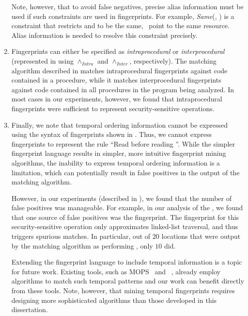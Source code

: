 \begin{enumerate}
Note, however, that to avoid false negatives, precise alias information must be
used if such constraints are used in fingerprints. For example,
\textit{Same}(, ) is a constraint that
restricts  and  to be the same,
\ie~point to the same resource. Alias information is needed to resolve this
constraint precisely. 

\item
Fingerprints can either be specified as \textit{intraprocedural} or
\textit{interprocedural} (represented in 
using $\wedge_{Intra}$ and $\wedge_{Inter}$, respectively). The matching
algorithm described in  matches intraprocedural
fingerprints against code contained in a procedure, while it matches
interprocedural fingerprints against code contained in all procedures in the
program being analyzed. In most cases in our experiments, however, we found
that intraprocedural fingerprints were sufficient to represent
security-sensitive operations.

\item 
Finally, we note that temporal ordering information cannot be expressed using
the syntax of fingerprints shown in .
Thus, we cannot express fingerprints to represent the rule ``Read
 before reading ''. While
the simpler fingerprint language results in simpler, more intuitive fingerprint
mining algorithms, the inability to express temporal ordering information is a
limitation, which can potentially result in false positives in the output of
the matching algorithm.

However, in our experiments (described in ), we found
that the number of false positives was manageable. For example, in our analysis
of the \xserver, we found that one source of false positives was the
 fingerprint. The fingerprint for this security-sensitive
operation only approximates linked-list traversal, and thus triggers spurious
matches. In particular, out of $20$ locations that were output by the matching
algorithm as performing , only $10$ did.

Extending the fingerprint language to include temporal information is a topic
for future work. Existing tools, such as MOPS~\cite{cw02} and
~\cite{hcx+02}, already employ algorithms to match such temporal
patterns and our work can benefit directly from these tools. Note, however,
that mining temporal fingerprints requires designing more sophisticated
algorithms than those developed in this dissertation. 

\end{enumerate}


